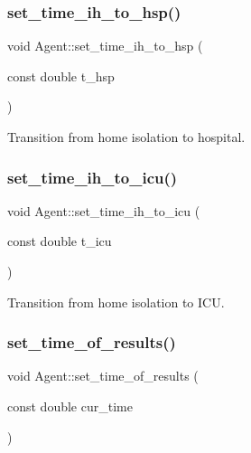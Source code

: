 \subsubsection{\texorpdfstring{set\+\_\+time\+\_\+ih\+\_\+to\+\_\+hsp()}{set\_time\_ih\_to\_hsp()}}
{\footnotesize\ttfamily void Agent\+::set\+\_\+time\+\_\+ih\+\_\+to\+\_\+hsp (\begin{DoxyParamCaption}\item[{const double}]{t\+\_\+hsp }\end{DoxyParamCaption})\hspace{0.3cm}{\ttfamily [inline]}}



Transition from home isolation to hospital. 

\mbox{\label{classAgent_a3f52852fe867096f13ec980a67a62d16}} 
\subsubsection{\texorpdfstring{set\+\_\+time\+\_\+ih\+\_\+to\+\_\+icu()}{set\_time\_ih\_to\_icu()}}
{\footnotesize\ttfamily void Agent\+::set\+\_\+time\+\_\+ih\+\_\+to\+\_\+icu (\begin{DoxyParamCaption}\item[{const double}]{t\+\_\+icu }\end{DoxyParamCaption})\hspace{0.3cm}{\ttfamily [inline]}}



Transition from home isolation to I\+CU. 

\mbox{\label{classAgent_a7d07d44ee7fd59ddf82a0be09b5dcdf9}} 
\subsubsection{\texorpdfstring{set\+\_\+time\+\_\+of\+\_\+results()}{set\_time\_of\_results()}}
{\footnotesize\ttfamily void Agent\+::set\+\_\+time\+\_\+of\+\_\+results (\begin{DoxyParamCaption}\item[{const double}]{cur\+\_\+time }\end{DoxyParamCaption})\hspace{0.3cm}{\ttfamily [inline]}}

